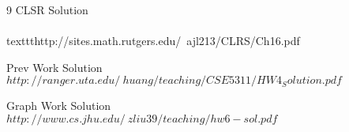 \documentclass[5pt]{article}
\begin{document}
\begin{thebibliography} {9}
CLSR Solution
\\\\texttt{http://sites.math.rutgers.edu/~ajl213/CLRS/Ch16.pdf}

Prev Work Solution 
\\\texttt{$http://ranger.uta.edu/~huang/teaching/CSE5311/HW4_Solution.pdf$}

Graph Work Solution 
\\\texttt{$http://www.cs.jhu.edu/~zliu39/teaching/hw6-sol.pdf$}


 \end{thebibliography}
\end{document}
